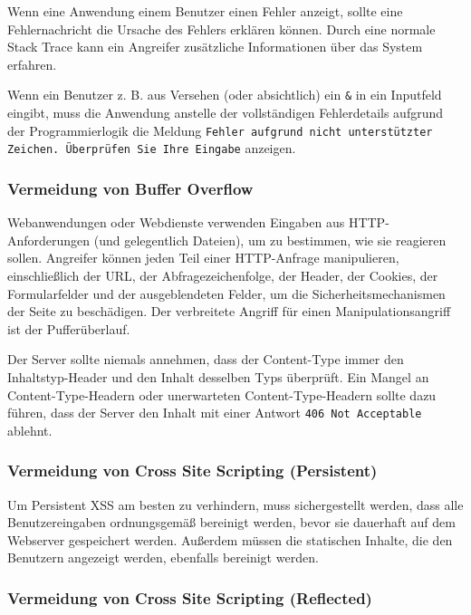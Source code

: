 Wenn eine Anwendung einem Benutzer einen Fehler anzeigt, sollte eine Fehlernachricht die Ursache des Fehlers erklären können. Durch eine normale Stack Trace kann ein Angreifer zusätzliche Informationen über das System erfahren.

Wenn ein Benutzer z. B. aus Versehen (oder absichtlich) ein \texttt{\&} in ein Inputfeld eingibt, muss die Anwendung anstelle der vollständigen Fehlerdetails aufgrund der Programmierlogik die Meldung \texttt{Fehler aufgrund nicht unterstützter Zeichen. Überprüfen Sie Ihre Eingabe} anzeigen\cite{ase17}.

\subsubsection{Vermeidung von Buffer Overflow}

Webanwendungen oder Webdienste verwenden Eingaben aus HTTP-Anforderungen (und gelegentlich Dateien), um zu bestimmen, wie sie reagieren sollen. Angreifer können jeden Teil einer HTTP-Anfrage manipulieren, einschließlich der URL, der Abfragezeichenfolge, der Header, der Cookies, der Formularfelder und der ausgeblendeten Felder, um die Sicherheitsmechanismen der Seite zu beschädigen. Der verbreitete Angriff für einen Manipulationsangriff ist der Pufferüberlauf.

Der Server sollte niemals annehmen, dass der Content-Type immer den Inhaltstyp-Header und den Inhalt desselben Typs überprüft. Ein Mangel an Content-Type-Headern oder unerwarteten Content-Type-Headern sollte dazu führen, dass der
Server den Inhalt mit einer Antwort \texttt{406 Not Acceptable} ablehnt\cite{bofangpre16}.

\subsubsection{Vermeidung von Cross Site Scripting (Persistent)}

Um Persistent XSS am besten zu verhindern, muss sichergestellt werden, dass alle Benutzereingaben ordnungsgemäß bereinigt werden, bevor sie dauerhaft auf dem Webserver gespeichert werden. Außerdem müssen die statischen Inhalte, die den Benutzern angezeigt werden, ebenfalls bereinigt werden\cite{xsspersistent14}.

\subsubsection{Vermeidung von Cross Site Scripting (Reflected)}

